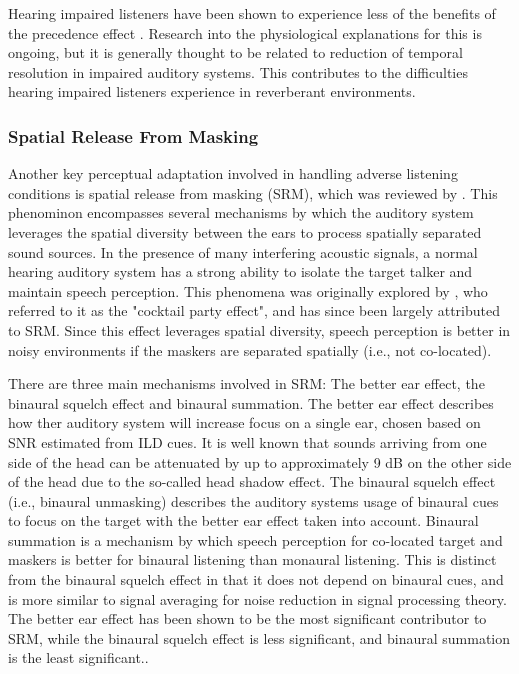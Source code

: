 Hearing impaired listeners have been shown to experience less of the benefits of the precedence effect \citep{roberts2003effects, rennies2022spatio}. Research into the physiological explanations for this is ongoing, but it is generally thought to be related to reduction of temporal resolution in impaired auditory systems. This contributes to the difficulties hearing impaired listeners experience in reverberant environments.  

\subsubsection{Spatial Release From Masking} \label{section_srm}

Another key perceptual adaptation involved in handling adverse listening conditions is spatial release from masking (SRM), which was reviewed by  \cite{litovsky2012spatial}. This phenominon encompasses several mechanisms by which the auditory system leverages the spatial diversity between the ears to process spatially separated sound sources. In the presence of many interfering acoustic signals, a normal hearing auditory system has a strong ability to isolate the target talker and maintain speech perception. This phenomena was originally explored by \cite{cherry1953some}, who referred to it as the "cocktail party effect", and has since been largely attributed to SRM. Since this effect leverages spatial diversity, speech perception is better in noisy environments if the maskers are separated spatially (i.e., not co-located). 

There are three main mechanisms involved in SRM: The better ear effect, the binaural squelch effect and binaural summation. The better ear effect describes how ther auditory system will increase focus on a single ear, chosen based on SNR estimated from ILD cues. It is well known that sounds arriving from one side of the head can be attenuated by up to approximately 9 dB on the other side of the head due to the so-called head shadow effect. The binaural squelch effect (i.e., binaural unmasking) describes the auditory systems usage of binaural cues to focus on the target with the better ear effect taken into account. Binaural summation is a mechanism by which speech perception for co-located target and maskers is better for binaural listening than monaural listening. This is distinct from the binaural squelch effect in that it does not depend on binaural cues, and is more similar to signal averaging for noise reduction in signal processing theory. The better ear effect has been shown to be the most significant contributor to SRM, while the binaural squelch effect is less significant, and binaural summation is the least significant.. 

